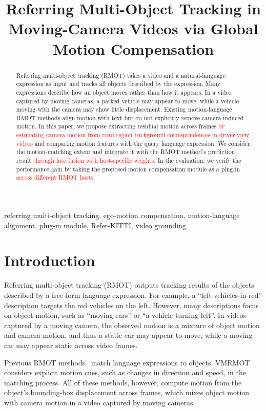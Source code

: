 \documentclass{article}
\title{Referring Multi-Object Tracking in Moving-Camera Videos via Global Motion Compensation}
\begin{document}
\ninept
%
\maketitle
%
\begin{abstract}
  Referring multi-object tracking (RMOT) takes a video and a natural-language expression as input and tracks all objects described by the expression. Many expressions describe how an object moves rather than how it appears. In a video captured by moving cameras, a parked vehicle may appear to move, while a vehicle moving with the camera may show little displacement. Existing motion-language RMOT methods align motion with text but do not explicitly remove camera-induced motion. In this paper, we propose extracting residual motion across frames \textcolor{red}{by estimating camera motion from road-region background correspondences in driver-view videos} and comparing motion features with the query language expression. We consider the motion-matching extent and integrate it with the RMOT method's prediction result \textcolor{red}{through late fusion with host-specific weights}. In the evaluation, we verify the performance gain by taking the proposed motion compensation module as a plug-in \textcolor{red}{across different RMOT hosts}.
\end{abstract}
%
\begin{keywords}
  referring multi-object tracking, ego-motion compensation, motion-language alignment, plug-in module, Refer-KITTI, video grounding
\end{keywords}


\section{Introduction}
\label{sec:intro}
Referring multi-object tracking (RMOT) outputs tracking results of the objects described by a free-form language expression. For example, a \enquote{left-vehicles-in-red} description targets the red vehicles on the left. However, many descriptions focus on object motion, such as \enquote{moving cars} or \enquote{a vehicle turning left}. In videos captured by a moving camera, the observed motion is a mixture of object motion and camera motion, and thus a static car may appear to move, while a moving car may appear static across video frames.

Previous RMOT methods~\cite{transrmot,ikun,flexhook} match language expressions to objects.  VMRMOT~\cite{vmrmot} considers explicit motion cues, such as changes in direction and speed, in the matching process. All of these methods, however, compute motion from the object's bounding-box displacement across frames, which mixes object motion with camera motion in a video captured by moving cameras.
\end{document}
